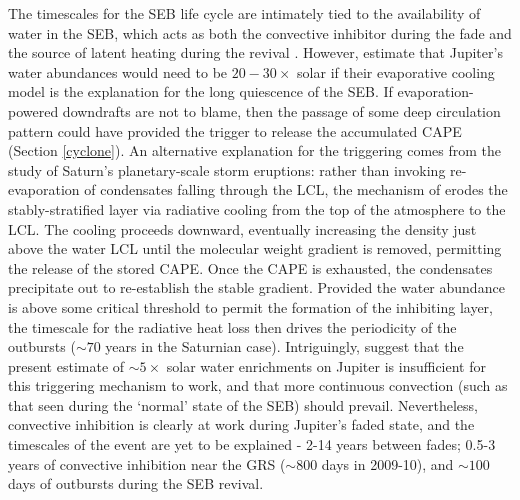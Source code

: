 \documentclass[final,authoryear,5p,times,twocolumn]{elsarticle}
\begin{document}
The timescales for the SEB life cycle are intimately tied to the availability of water in the SEB, which acts as both the convective inhibitor during the fade and the source of latent heating during the revival \citep[e.g.,][]{01hueso, 02hueso, 14sugiyama, 15li}. However, \citet{14sugiyama} estimate that Jupiter's water abundances would need to be $20-30\times$ solar if their evaporative cooling model is the explanation for the long quiescence of the SEB.   If evaporation-powered downdrafts are not to blame, then the passage of some deep circulation pattern could have provided the trigger to release the accumulated CAPE (Section \ref{cyclone}).  An alternative explanation for the triggering comes from the study of Saturn's planetary-scale storm eruptions:  rather than invoking re-evaporation of condensates falling through the LCL, the mechanism of \citet{15li} erodes the stably-stratified layer via radiative cooling from the top of the atmosphere to the LCL.  The cooling proceeds downward, eventually increasing the density just above the water LCL until the molecular weight gradient is removed, permitting the release of the stored CAPE.  Once the CAPE is exhausted, the condensates precipitate out to re-establish the stable gradient.  Provided the water abundance is above some critical threshold to permit the formation of the inhibiting layer, the timescale for the radiative heat loss then drives the periodicity of the outbursts ($\sim70$ years in the Saturnian case).  Intriguingly, \citet{15li} suggest that the present estimate of $\sim5\times$ solar water enrichments on Jupiter is insufficient for this triggering mechanism to work, and that more continuous convection (such as that seen during the `normal' state of the SEB) should prevail.  Nevertheless, convective inhibition is clearly at work during Jupiter's faded state, and the timescales of the event are yet to be explained - 2-14 years between fades; 0.5-3 years of convective inhibition near the GRS ($\sim800$ days in 2009-10), and $\sim100$ days of outbursts during the SEB revival.
\end{document}

